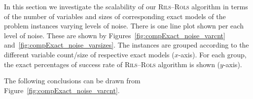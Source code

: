 \documentclass[a4paper,12pt]{elsarticle}
\begin{document}
\begin{center}
	\label{fig:compR2_noise_size}
\end{center}


In this section we investigate the  scalability of our \textsc{Rils}--\textsc{Rols} algorithm in terms of the number of variables and sizes of corresponding exact models of the problem instances varying levels of noise. There is one line plot shown per each level of noise.  These are shown by Figures~\ref{fig:compExact_noise_varcnt} and~\ref{fig:compExact_noise_varsizes}. The instances are grouped according to the different variable count/size of respective exact models ($x$-axis). For each group, the exact percentages of success rate of \textsc{Rils}--\textsc{Rols} algorithm is shown ($y$-axis).

 The following conclusions can be drawn from Figure~\ref{fig:compExact_noise_varcnt}.
\end{document}
